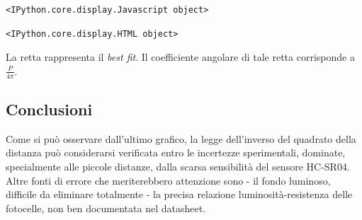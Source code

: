 \documentclass[11pt]{article}
\begin{document}
    
    \begin{verbatim}
<IPython.core.display.Javascript object>
    \end{verbatim}

    
    
    \begin{verbatim}
<IPython.core.display.HTML object>
    \end{verbatim}

    
    La retta rappresenta il \emph{best fit}. Il coefficiente angolare di
tale retta corrisponde a \(\frac{P}{4\pi}\).

    \hypertarget{conclusioni}{%
\subsection{Conclusioni}\label{conclusioni}}

Come si può osservare dall'ultimo grafico, la legge dell'inverso del
quadrato della distanza può considerarsi verificata entro le incertezze
sperimentali, dominate, specialmente alle piccole distanze, dalla scarsa
sensibilità del sensore HC-SR04. Altre fonti di errore che meriterebbero
attenzione sono - il fondo luminoso, difficile da eliminare totalmente -
la precisa relazione luminosità-resistenza delle fotocelle, non ben
documentata nel datasheet.


    
    
    
    
\end{document}
